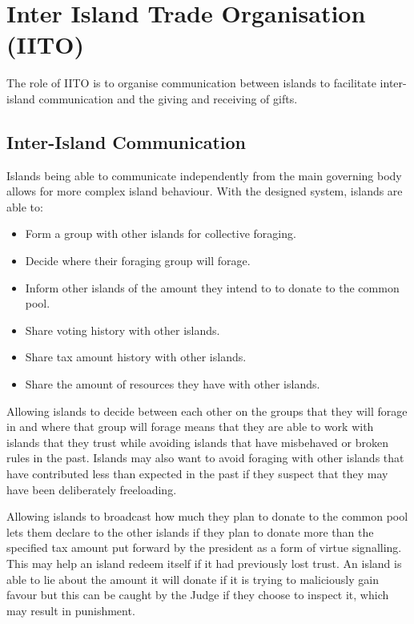 \chapter{Inter Island Trade Organisation (IITO)}

The role of IITO is to organise communication between islands to facilitate inter-island communication and the giving and receiving of gifts.


\section{Inter-Island Communication}  
\label{sec:IITO:inter_island_communication}

Islands being able to communicate independently from the main governing body allows for more complex island behaviour. With the designed system, islands are able to:

\begin{itemize}
    \item Form a group with other islands for collective foraging.
    \item Decide where their foraging group will forage.
    \item Inform other islands of the amount they intend to to donate to the common pool.
    \item Share voting history with other islands.
    \item Share tax amount history with other islands.
    \item Share the amount of resources they have with other islands.
\end{itemize}

Allowing islands to decide between each other on the groups that they will forage in and where that group will forage means that they are able to work with islands that they trust while avoiding islands that have misbehaved or broken rules in the past. Islands may also want to avoid foraging with other islands that have contributed less than expected in the past if they suspect that they may have been deliberately freeloading.

Allowing islands to broadcast how much they plan to donate to the common pool lets them declare to the other islands if they plan to donate more than the specified tax amount put forward by the president as a form of virtue signalling. This may help an island redeem itself if it had previously lost trust. An island is able to lie about the amount it will donate if it is trying to maliciously gain favour but this can be caught by the Judge if they choose to inspect it, which may result in punishment.

